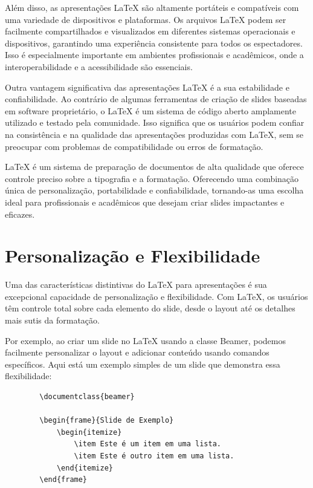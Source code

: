Além disso, as apresentações LaTeX são altamente portáteis e compatíveis com uma variedade de dispositivos e plataformas. Os arquivos LaTeX podem ser facilmente compartilhados e visualizados em diferentes sistemas operacionais e dispositivos, garantindo uma experiência consistente para todos os espectadores. Isso é especialmente importante em ambientes profissionais e acadêmicos, onde a interoperabilidade e a acessibilidade são essenciais.

Outra vantagem significativa das apresentações LaTeX é a sua estabilidade e confiabilidade. Ao contrário de algumas ferramentas de criação de slides baseadas em software proprietário, o LaTeX é um sistema de código aberto amplamente utilizado e testado pela comunidade. Isso significa que os usuários podem confiar na consistência e na qualidade das apresentações produzidas com LaTeX, sem se preocupar com problemas de compatibilidade ou erros de formatação.



\begin{definition}
    LaTeX é um sistema de preparação de documentos de alta qualidade que oferece controle preciso sobre a tipografia e a formatação. Oferecendo uma combinação única de personalização, portabilidade e confiabilidade, tornando-as uma escolha ideal para profissionais e acadêmicos que desejam criar slides impactantes e eficazes.
\end{definition}

\section{Personalização e Flexibilidade}
\label{sec:personalizacao}

Uma das características distintivas do LaTeX para apresentações é sua excepcional capacidade de personalização e flexibilidade. Com LaTeX, os usuários têm controle total sobre cada elemento do slide, desde o layout até os detalhes mais sutis da formatação.

Por exemplo, ao criar um slide no LaTeX usando a classe Beamer, podemos facilmente personalizar o layout e adicionar conteúdo usando comandos específicos. Aqui está um exemplo simples de um slide que demonstra essa flexibilidade:

\begin{example}
    \begin{verbatim}
        \documentclass{beamer}
        
        \begin{frame}{Slide de Exemplo}
            \begin{itemize}
                \item Este é um item em uma lista.
                \item Este é outro item em uma lista.
            \end{itemize}
        \end{frame}
        
    \end{verbatim}
\end{example}


